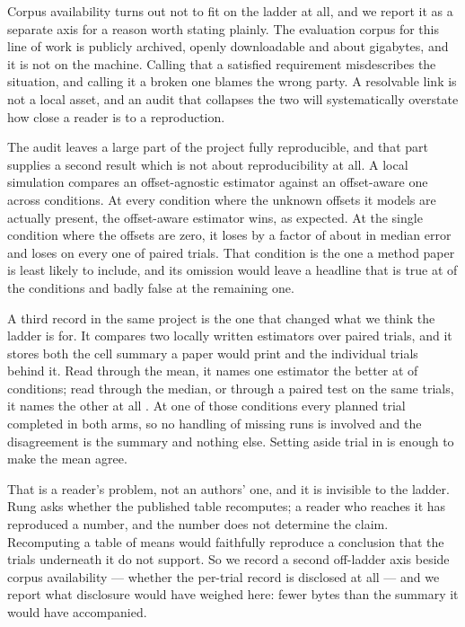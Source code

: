 Corpus availability turns out not to fit on the ladder at all, and we report it
as a separate axis for a reason worth stating plainly. The evaluation corpus for
this line of work is publicly archived, openly downloadable and about
\CorpusGB{} gigabytes, and it is not on the machine. Calling that a satisfied
requirement misdescribes the situation, and calling it a broken one blames the
wrong party. A resolvable link is not a local asset, and an audit that collapses
the two will systematically overstate how close a reader is to a reproduction.

The audit leaves a large part of the project fully reproducible, and that part
supplies a second result which is not about reproducibility at all. A local
simulation compares an offset-agnostic estimator against an offset-aware one
across \NConditions{} conditions. At every condition where the unknown offsets it
models are actually present, the offset-aware estimator wins, as expected. At the
single condition where the offsets are zero, it loses by a factor of about
\ZeroRatio{} in median error and loses on every one of \NTrials{} paired trials.
That condition is the one a method paper is least likely to include, and its
omission would leave a headline that is true at \NonZeroConditions{} of the
\NConditions{} conditions and badly false at the remaining one.

A third record in the same project is the one that changed what we think the
ladder is for. It compares two locally written estimators over \CxPlanned{}
paired trials, and it stores both the cell summary a paper would print and the
individual trials behind it. Read through the mean, it names one estimator the
better at \CxDisagreeing{} of \CxConditions{} conditions; read through the
median, or through a paired test on the same trials, it names the other at all
\CxConditions{}. At one of those conditions every planned trial completed in
both arms, so no handling of missing runs is involved and the disagreement is
the summary and nothing else. Setting aside \CxFlipDepth{} trial in
\CxTrialsPerCondition{} is enough to make the mean agree.

That is a reader's problem, not an authors' one, and it is invisible to the
ladder. Rung \NRungs{} asks whether the published table recomputes; a reader who
reaches it has reproduced a number, and the number does not determine the claim.
Recomputing a table of means would faithfully reproduce a conclusion that the
trials underneath it do not support. So we record a second off-ladder axis
beside corpus availability --- whether the per-trial record is disclosed at all
--- and we report what disclosure would have weighed here: fewer bytes than the
summary it would have accompanied.

